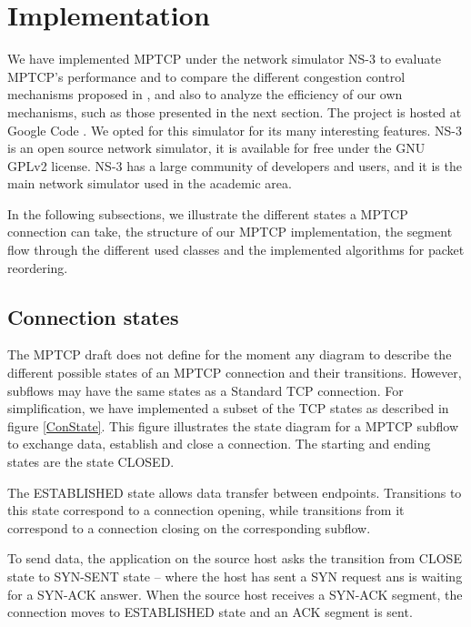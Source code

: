 \documentclass{sig-alternate}
\begin{document}
\vspace{1cm}

\section{Implementation}\label{sec:implementation}

We have implemented MPTCP under the network simulator NS-3 \cite{ns3} to evaluate MPTCP's performance and to compare the different congestion control mechanisms proposed in \cite{raiciu09}, and also to analyze the efficiency of our own mechanisms, such as those presented in the next section. The project is hosted at Google Code \cite{MpTCP}. We opted for this simulator for its many interesting features. NS-3 is an open source network simulator, it is available for free under the GNU GPLv2 \cite{gpl} license. NS-3 has a large community of developers and users, and it is the main network simulator used in the academic area.

In the following subsections, we illustrate the different states a MPTCP connection can take, the structure of our MPTCP implementation, the segment flow through the different used classes and the implemented algorithms for packet reordering.

\subsection{Connection states}

The MPTCP draft does not define for the moment any diagram to describe the different possible states of an MPTCP connection and their transitions. However, subflows may have the same states as a Standard TCP connection. For simplification, we have implemented a subset of the TCP states as described in figure \ref{ConState}. This figure illustrates the state diagram for a MPTCP subflow to exchange data, establish and close a connection. The starting and ending states are the state CLOSED.

The ESTABLISHED state allows data transfer between endpoints. Transitions to this state correspond to a connection opening, while transitions from it correspond to a connection closing on the corresponding subflow. 

To send data, the application on the source host asks the transition from CLOSE state to SYN-SENT state -- where the host has sent a SYN request ans is waiting for a SYN-ACK answer. When the source host receives a SYN-ACK segment, the connection moves to ESTABLISHED state and an ACK segment is sent. 
\end{document}
